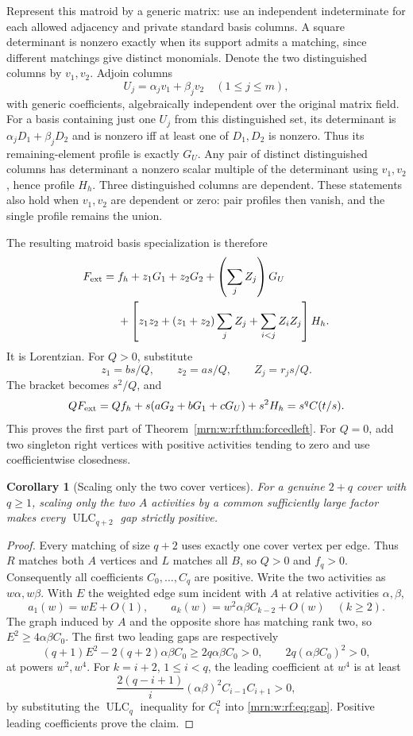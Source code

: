 \documentclass[11pt,a4paper]{article}
\newtheorem{corollary}[theorem]{Corollary}
\theoremstyle{remark}\newtheorem{remark}[theorem]{Remark}
\newcommand{\ULC}{\operatorname{ULC}}      %
\begin{document}
Represent this matroid by a generic matrix: use an independent indeterminate for each allowed adjacency and private standard basis columns. A square determinant is nonzero exactly when its support admits a matching, since different matchings give distinct monomials. Denote the two distinguished columns by $v_1,v_2$. Adjoin columns
\[
 U_j=\alpha_jv_1+\beta_jv_2\quad(1\le j\le m),
\]
with generic coefficients, algebraically independent over the original matrix field. For a basis containing just one $U_j$ from this distinguished set, its determinant is $\alpha_jD_1+\beta_jD_2$ and is nonzero iff at least one of $D_1,D_2$ is nonzero. Thus its remaining-element profile is exactly $G_U$. Any pair of distinct distinguished columns has determinant a nonzero scalar multiple of the determinant using $v_1,v_2$, hence profile $H_h$. Three distinguished columns are dependent. These statements also hold when $v_1,v_2$ are dependent or zero: pair profiles then vanish, and the single profile remains the union.

The resulting matroid basis specialization is therefore
\begin{align}\label{mrn:w:rf:eq:Fext}
 F_{\rm ext}={}&f_h+z_1G_1+z_2G_2+\left(\sum_jZ_j\right)G_U\notag\\
 &+\left[z_1z_2+(z_1+z_2)\sum_jZ_j+\sum_{i<j}Z_iZ_j\right]H_h.
\end{align}
It is Lorentzian. For $Q>0$, substitute
\[
 z_1=bs/Q,\qquad z_2=as/Q,\qquad Z_j=r_js/Q.
\]
The bracket becomes $s^2/Q$, and
\[
 QF_{\rm ext}=Qf_h+s(aG_2+bG_1+cG_U)+s^2H_h=s^qC(t/s).
\]
This proves the first part of Theorem~\ref{mrn:w:rf:thm:forcedleft}. For $Q=0$, add two singleton right vertices with positive activities tending to zero and use coefficientwise closedness.

\begin{corollary}[Scaling only the two cover vertices]\label{mrn:w:rf:cor:two-scale}
For a genuine $2+q$ cover with $q\ge1$, scaling only the two $A$ activities by a common sufficiently large factor makes every $\ULC_{q+2}$ gap strictly positive.
\end{corollary}
\begin{proof}
Every matching of size $q+2$ uses exactly one cover vertex per edge. Thus $R$ matches both $A$ vertices and $L$ matches all $B$, so $Q>0$ and $f_q>0$. Consequently all coefficients $C_0,\ldots,C_q$ are positive. Write the two activities as $w\alpha,w\beta$. With $E$ the weighted edge sum incident with $A$ at relative activities $\alpha,\beta$,
\[
 a_1(w)=wE+O(1),\qquad
 a_k(w)=w^2\alpha\beta C_{k-2}+O(w)\quad(k\ge2).
\]
The graph induced by $A$ and the opposite shore has matching rank two, so $E^2\ge4\alpha\beta C_0$. The first two leading gaps are respectively
\[
 (q+1)E^2-2(q+2)\alpha\beta C_0\ge2q\alpha\beta C_0>0,
 \qquad 2q(\alpha\beta C_0)^2>0,
\]
at powers $w^2,w^4$. For $k=i+2$, $1\le i<q$, the leading coefficient at $w^4$ is at least
\[
 \frac{2(q-i+1)}{i}(\alpha\beta)^2C_{i-1}C_{i+1}>0,
\]
by substituting the $\ULC_q$ inequality for $C_i^2$ into \eqref{mrn:w:rf:eq:gap}. Positive leading coefficients prove the claim.
\end{proof}
\end{document}
